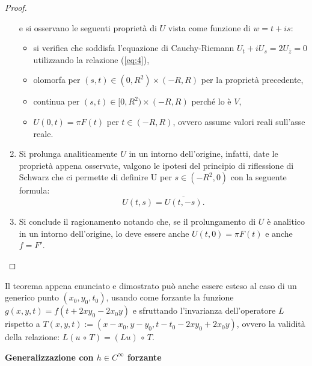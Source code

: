 \begin{example}
\begin{proof}
\begin{enumerate}[1.]
e si osservano le seguenti proprietà di $U$ vista come funzione di $w=t+is$: 
\begin{itemize}
\item
si verifica che soddisfa l'equazione di Cauchy-Riemann $U_t+iU_s=2U_{\overline{z}}=0$ utilizzando la relazione (\ref{eq:4}),
\item
olomorfa per $(s,t) \in (0,R^2) \times (-R,R)$ per la proprietà precedente,
\item
continua per $(s,t) \in [0,R^2) \times (-R,R)$ perché lo è $V$,
\item
$U(0,t)=\pi F(t)$ per $t\in (-R,R)$, ovvero assume valori reali sull'asse reale.
\end{itemize}
\item
Si prolunga analiticamente $U$ in un intorno dell'origine, infatti, 
date le proprietà appena osservate, valgono le ipotesi del principio di riflessione di Schwarz che ci permette 
di definire U per $s\in (-R^2,0)$ con la seguente formula: $$U(t,s)=\overline{U(t,-s)}.$$
\item
Si conclude il ragionamento notando che, se il prolungamento di $U$ è analitico in un intorno dell'origine, lo deve essere anche $U(t,0)=\pi F(t)$ e anche $f=F'$.
\end{enumerate}
\end{proof}

Il teorema appena enunciato e dimostrato può anche essere esteso al caso di un generico punto $(x_0,y_0,t_0)$, usando come forzante la funzione $g(x,y,t)=f(t+2xy_0-2x_0y)$ e sfruttando l'invarianza dell'operatore $L$ rispetto a 
$T(x,y,t):=(x-x_0,y-y_0,t-t_0-2xy_0+2x_0y)$, ovvero la validità della relazione: $L(u \,\circ\, T)=(Lu) \,\circ\, T$.

\textbf{Generalizzazione con $h \in C^\infty$ forzante}
\end{example}



